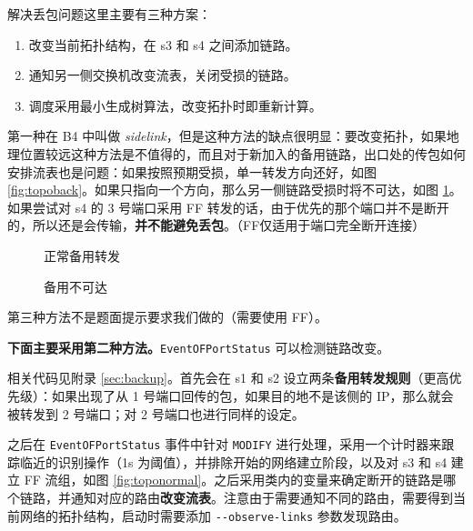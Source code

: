     解决丢包问题这里主要有三种方案：
    \begin{enumerate}
        \item 改变当前拓扑结构，在 s3 和 s4 之间添加链路。
        \item 通知另一侧交换机改变流表，关闭受损的链路。
        \item 调度采用最小生成树算法，改变拓扑时即重新计算。
    \end{enumerate}

    第一种在 B4 中叫做 \emph{sidelink}\cite{Hong2018}，但是这种方法的缺点很明显：要改变拓扑，如果地理位置较远这种方法是不值得的，而且对于新加入的备用链路，出口处的传包如何安排流表也是问题：如果按照预期受损，单一转发方向还好，如图 \ref{fig:topoback}。如果只指向一个方向，那么另一侧链路受损时将不可达，如图 \ref{fig:topoback2}。如果尝试对 s4 的 3 号端口采用 FF 转发的话，由于优先的那个端口并不是断开的，所以还是会传输，\textbf{并不能避免丢包}。（FF仅适用于端口完全断开连接）

    \begin{figure}[H]
        \centering
        \begin{minipage}{0.48\textwidth}
            \centering
            
            \caption{正常备用转发}\label{fig:topoback}
        \end{minipage}
        \begin{minipage}{0.48\textwidth}
            \centering
            
            \caption{备用不可达}\label{fig:topoback2}
        \end{minipage}
    \end{figure}

    第三种方法不是题面提示要求我们做的（需要使用 FF）。

    \textbf{下面主要采用第二种方法。}\verb"EventOFPortStatus" 可以检测链路改变。


    相关代码见附录 \ref{sec:backup}。首先会在 s1 和 s2 设立两条\textbf{备用转发规则}（更高优先级）：如果出现了从 1 号端口回传的包，如果目的地不是该侧的 IP，那么就会被转发到 2 号端口；对 2 号端口也进行同样的设定。
    
    之后在 \verb"EventOFPortStatus" 事件中针对 \verb"MODIFY" 进行处理，采用一个计时器来跟踪临近的识别操作（1s 为阈值），并排除开始的网络建立阶段，以及对 s3 和 s4 建立 FF 流组，如图 \ref{fig:toponormal}。之后采用类内的变量来确定断开的链路是哪个链路，并通知对应的路由\textbf{改变流表}。注意由于需要通知不同的路由，需要得到当前网络的拓扑结构，启动时需要添加 \verb"--observe-links" 参数发现路由。


